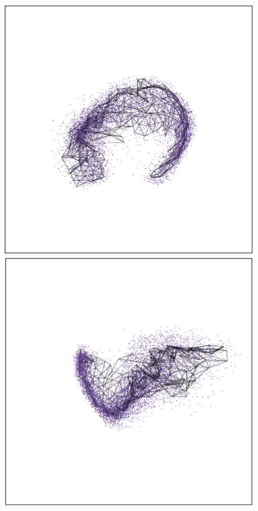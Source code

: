 \documentclass[
  12pt]{article}
\begin{document}
\begin{figure}[H]

\begin{minipage}{0.33\linewidth}
\includegraphics{figures/mnist/sc_1.png}\end{minipage}%
%
\begin{minipage}{0.33\linewidth}
\includegraphics{figures/mnist/sc_2.png}\end{minipage}%

\end{figure}
\end{document}

